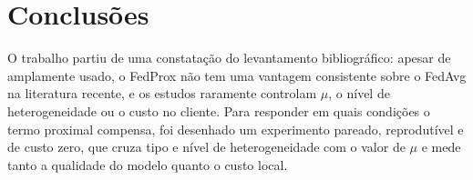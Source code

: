 \section{Conclusões}
\label{conclusoes}

O trabalho partiu de uma constatação do levantamento bibliográfico: apesar de amplamente usado, o FedProx não tem uma vantagem consistente sobre o FedAvg na literatura recente, e os estudos raramente controlam $\mu$, o nível de heterogeneidade ou o custo no cliente. Para responder em quais condições o termo proximal compensa, foi desenhado um experimento pareado, reprodutível e de custo zero, que cruza tipo e nível de heterogeneidade com o valor de $\mu$ e mede tanto a qualidade do modelo quanto o custo local. 
